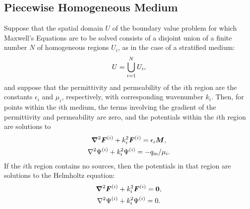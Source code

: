\subsection{Piecewise Homogeneous Medium}
Suppose that the spatial domain $U$ of the boundary value problem
for which Maxwell's Equations are to be
solved consists of a disjoint union of a finite number $N$ of
homogeneous regions $U_i$, as in the case of a stratified medium:
\begin{equation}
  U = \bigcup_{i=1}^{N} U_i,
\end{equation}
and suppose that the permittivity and permeability of the $i$th region
are the constants $\epsilon_i$ and $\mu_i$, respectively, with corresponding
wavenumber $k_i$.  Then, for
points within the $i$th medium, the terms involving the gradient of
the permittivity and permeability are zero, and the 
potentials within the $i$th region are solutions to 
\begin{subequations}
  \begin{gather}
    \boldsymbol{\nabla}^2\boldsymbol{F}^{(i)} + k_i^2 \boldsymbol{F}^{(i)}  = \epsilon_i\boldsymbol{M}, \\
    \nabla^2\Psi^{(i)} + k_i^2 \Psi^{(i)}  = -q_{\text{m}}/\mu_i.
  \end{gather}
\end{subequations}
If the $i$th region contains no sources, then the potentials
in that region are solutions to the Helmholtz equation:
\begin{subequations}
  \begin{gather}
    \boldsymbol{\nabla}^2\boldsymbol{F}^{(i)} + k_i^2 \boldsymbol{F}^{(i)}  = \boldsymbol{0}, \\
    \nabla^2\Psi^{(i)} + k_i^2 \Psi^{(i)}  = 0.
  \end{gather}
\end{subequations}


